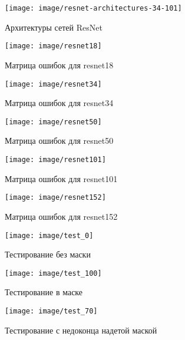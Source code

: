 \documentclass[a4paper,14pt]{article}
\begin{document}
	\begin{figure}[H]
		\centering
		\texttt{[image: image/resnet-architectures-34-101]}
		\caption{Архитектуры сетей ResNet}
		\label{fig:resnet-architectures-34-101}
	\end{figure}
	
	
	\begin{figure}[H]
		\centering
		\texttt{[image: image/resnet18]}
		\caption{Матрица ошибок для resnet18}
		\label{fig:resnet18}
	\end{figure}
	
	\begin{figure}[H]
		\centering
		\texttt{[image: image/resnet34]}
		\caption{Матрица ошибок для resnet34}
		\label{fig:resnet34}
	\end{figure}
	
	\begin{figure}[H]
		\centering
		\texttt{[image: image/resnet50]}
		\caption{Матрица ошибок для resnet50}
		\label{fig:resnet50}
	\end{figure}
	
	\begin{figure}[H]
		\centering
		\texttt{[image: image/resnet101]}
		\caption{Матрица ошибок для resnet101}
		\label{fig:resnet101}
	\end{figure}
	
	\begin{figure}[H]
		\centering
		\texttt{[image: image/resnet152]}
		\caption{Матрица ошибок для resnet152}
		\label{fig:resnet152}
	\end{figure}
	
	\begin{figure}[H]
		\centering
		\texttt{[image: image/test\_0]}
		\caption{Тестирование без маски}
		\label{fig:test0}
	\end{figure}
	
	\begin{figure}[H]
		\centering
		\texttt{[image: image/test\_100]}
		\caption{Тестирование в маске}
		\label{fig:test100}
	\end{figure}
	
	\begin{figure}[H]
		\centering
		\texttt{[image: image/test\_70]}
		\caption{Тестирование с недоконца надетой маской}
		\label{fig:test70}
	\end{figure}
	
	
	
\end{document}
